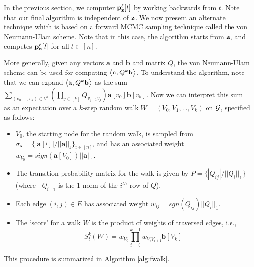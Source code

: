 In the previous section, we computer ${\mathbf{p}}_\mathbf{z}^{\ell}[t]$ by working backwards from $t$. 
Note that our final algorithm is independent of $\mathbf{z}$.
We now present an alternate technique which is based on a forward MCMC sampling technique called the von Neumann-Ulam scheme. 
Note that in this case, the algorithm starts from $\mathbf{z}$, and computes ${\mathbf{p}}_\mathbf{z}^{\ell}[t]$ for all $t\in[n]$.

More generally, given any vectors $\mathbf{a}$ and $\mathbf{b}$ and matrix $Q$, the von Neumann-Ulam scheme can be used for computing $\left< \mathbf{a}, Q^k\mathbf{b} \right>$.
To understand the algorithm, note that we can expand $\left< \mathbf{a}, Q^k\mathbf{b} \right>$ as the sum $\sum_{(v_0,\ldots, v_k) \in V^k}\left(\prod_{j \in [k]} Q_{v_{j-1}v_{j}} \right) \mathbf{a}[v_0] \mathbf{b}[v_k]$. 
Now we can interpret this sum as an expectation over a $k$-step random walk $W = (V_0,V_1,\ldots,V_k)$ on ${\mathcal{G}}$, specified as follows:
\begin{itemize}
\item $V_0$, the starting node for the random walk, is sampled from $\sigma_{\mathbf{a}} = \{|\mathbf{a}[i]|/||\mathbf{a}||_1\}_{i\in [n]}$, and has an associated weight $w_{V_0} = sign(\mathbf{a}[V_0])||\mathbf{a}||_1$.
\item The transition probability matrix for the walk is given by $P = \{|Q_{ij}|/||Q_i||_1\}$ (where $||Q_i||_1$ is the $1$-norm of the $i^{th}$ row of $Q$).
\item Each edge $(i,j)\in E$ has associated weight $w_{ij} = sgn(Q_{ij})||Q_i||_1$. 
\item The `score' for a walk $W$ is the product of weights of traversed edges, i.e.,
$$S_t^k(W) = w_{V_0}\prod_{i=0}^{k-1}w_{V_iV_{i+1}}\mathbf{b}[V_{k}]$$
\end{itemize}
This procedure is summarized in Algorithm \ref{alg:fwalk}. 


